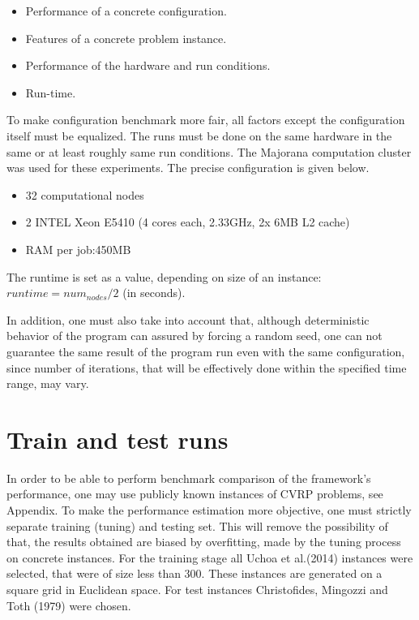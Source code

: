 \documentclass[11pt,a4paper,oneside]{book}
\begin{document}
\begin{itemize}
\item Performance of a concrete configuration.
\item Features of a concrete problem instance.
\item Performance of the hardware and run conditions.
\item Run-time.
\end{itemize}

To make configuration benchmark more fair, all factors except the configuration itself must be equalized. The runs must be done on the same hardware in the same or at least roughly same run conditions. The Majorana computation cluster was used for these experiments. The precise configuration is given below.
\begin{itemize}
\item 32 computational nodes
\item 2 INTEL Xeon E5410 (4 cores each, 2.33GHz, 2x 6MB L2 cache)
\item RAM per job:450MB
\end{itemize}

The runtime is set as a value, depending on size of an instance: $runtime = num_{nodes} / 2$ (in seconds).

In addition, one must also take into account that, although deterministic behavior of the program can assured by forcing a random seed, one can not guarantee the same result of the program run even with the same configuration, since number of iterations, that will be effectively done within the specified time range, may vary.

\section{Train and test runs}

In order to be able to perform benchmark comparison of the framework's performance, one may use publicly known instances of CVRP problems, see Appendix. To make the performance estimation more objective, one must strictly separate training (tuning) and testing set. This will remove the possibility of that, the results obtained are biased by overfitting, made by the tuning process on concrete instances. For the training stage all Uchoa et al.(2014) instances were selected, that were of size less than 300. These instances are generated on a square grid in Euclidean space. For test instances Christofides, Mingozzi and Toth (1979) were chosen.
\end{document}
